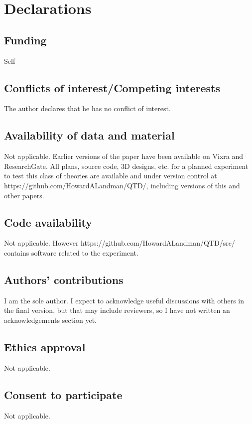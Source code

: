 \section*{Declarations}

\subsection*{Funding}
Self

\subsection*{Conflicts of interest/Competing interests}
The author declares that he has no conflict of interest.

\subsection*{Availability of data and material}
Not applicable.
Earlier versions of the paper have been available on Vixra and ResearchGate.
All plans, source code, 3D designs, etc. for a planned experiment to test this class of theories
are available and under version control at https://github.com/HowardALandman/QTD/,
including versions of this and other papers.

\subsection*{Code availability}
Not applicable.
However https://github.com/HowardALandman/QTD/src/
contains software related to the experiment.

\subsection*{Authors' contributions}
I am the sole author.
I expect to acknowledge useful discussions with others in the final version,
but that may include reviewers,
so I have not written an acknowledgements section yet.

\subsection*{Ethics approval}
Not applicable.

\subsection*{Consent to participate}
Not applicable.

